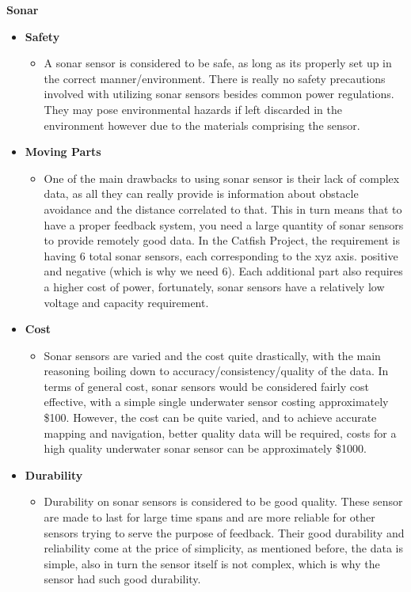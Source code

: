 \documentclass[12pt]{article}
\begin{document}
			\noindent\textbf{Sonar}
			{\renewcommand\labelitemi{}
				\begin{itemize}
					\item \textbf{Safety}
					\begin{itemize}
						\item A sonar sensor is considered to be safe, as long as its properly set up in the correct manner/environment. There is really no safety precautions involved with utilizing sonar sensors besides common power regulations. They may pose environmental hazards if left discarded in the environment however due to the materials comprising the sensor.
					\end{itemize}
					\item \textbf{Moving Parts}
					\begin{itemize}
						\item One of the main drawbacks to using sonar sensor is their lack of complex data, as all they can really provide is information about obstacle avoidance and the distance correlated to that. This in turn means that to have a proper feedback system, you need a large quantity of sonar sensors to provide remotely good data. In the Catfish Project, the requirement is having 6 total sonar sensors, each corresponding to the xyz axis. positive and negative (which is why we need 6). Each additional part also requires a higher cost of power, fortunately, sonar sensors have a relatively low voltage and capacity requirement. 
					\end{itemize}
					\item \textbf{Cost}
					\begin{itemize}
						\item Sonar sensors are varied and the cost quite drastically, with the main reasoning boiling down to accuracy/consistency/quality of the data. In terms of general cost, sonar sensors would be considered fairly cost effective, with a simple single underwater sensor costing approximately \$100. However, the cost can be quite varied, and to achieve accurate mapping and navigation, better quality data will be required, costs for a high quality underwater sonar sensor can be approximately \$1000. 
					\end{itemize}
					\item \textbf{Durability}
					\begin{itemize}
						\item Durability on sonar sensors is considered to be good quality. These sensor are made to last for large time spans and are more reliable for other sensors trying to serve the purpose of feedback. Their good durability and reliability come at the price of simplicity, as mentioned before, the data is simple, also in turn the sensor itself is not complex, which is why the sensor had such good durability. 

\end{itemize}
\end{itemize}}
\end{document}
